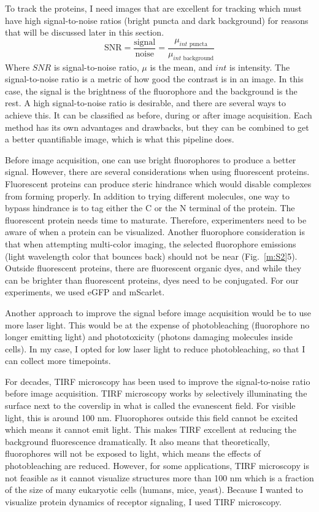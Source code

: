 To track the proteins, I need images that are excellent for tracking which must have high signal-to-noise ratios (bright puncta and dark background) for reasons that will be discussed later in this section.
\begin{equation*}
\text{SNR} = \frac{\text{signal}}{\text{noise}} = \frac{\mu_{int\text{ puncta}}}{\mu_{int \text{ background}}}
\end{equation*} 
Where $SNR$ is signal-to-noise ratio, $\mu$ is the mean, and $int$ is intensity.
The signal-to-noise ratio is a metric of how good the contrast is in an image. In this case, the signal is the brightness of the fluorophore and the background is the rest. A high signal-to-noise ratio is desirable, and there are several ways to achieve this. It can be classified as before, during or after image acquisition. Each method has its own advantages and drawbacks, but they can be combined to get a better quantifiable image, which is what this pipeline does.

Before image acquisition, one can use bright fluorophores to produce a better signal. However, there are several considerations when using fluorescent proteins. Fluorescent proteins can produce steric hindrance which would disable complexes from forming properly. In addition to trying different molecules, one way to bypass hindrance is to tag either the C or the N terminal of the protein. The fluorescent protein needs time to maturate. Therefore, experimenters need to be aware of when a protein can be visualized. Another fluorophore consideration is that when attempting multi-color imaging, the selected fluorophore emissions (light wavelength color that bounces back) should not be near (Fig.~\ref{m:S2}5). Outside fluorescent proteins, there are fluorescent organic dyes, and while they can be brighter than fluorescent proteins, dyes need to be conjugated. For our experiments, we used eGFP and mScarlet.

Another approach to improve the signal before image acquisition would be to use more laser light. This would be at the expense of photobleaching (fluorophore no longer emitting light) and phototoxicity (photons damaging molecules inside cells). In my case, I opted for low laser light to reduce photobleaching, so that I can collect more timepoints.

For decades, TIRF microscopy has been used to improve the signal-to-noise ratio before image acquisition. TIRF microscopy works by selectively illuminating the surface next to the coverslip in what is called the evanescent field. For visible light, this is around 100 nm. Fluorophores outside this field cannot be excited which means it cannot emit light. This makes TIRF excellent at reducing the background fluorescence dramatically. It also means that theoretically, fluorophores will not be exposed to light, which means the effects of photobleaching are reduced. However, for some applications, TIRF microscopy is not feasible as it cannot visualize structures more than 100 nm which is a fraction of the size of many eukaryotic cells (humans, mice, yeast). Because I wanted to visualize protein dynamics of receptor signaling, I used TIRF microscopy.


